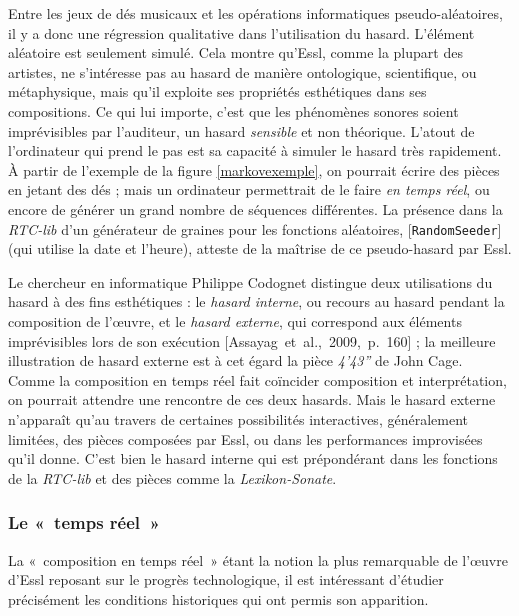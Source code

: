 \documentclass[a4paper,12pt]{article}
\newcommand{\guill}[1]{«~#1~»}
\newcommand{\patch}[1]{[\texttt{#1}]}
\newcommand{\cicite}[1]{{\footnotesize[#1]}}
\begin{document}
Entre les jeux de dés musicaux et les opérations informatiques pseudo-aléatoires, il y a donc une régression qualitative dans l'utilisation du hasard. L'élément aléatoire est seulement simulé. Cela montre qu'Essl, comme la plupart des artistes, ne s'intéresse pas au hasard de manière ontologique, scientifique, ou métaphysique, mais qu'il exploite ses propriétés esthétiques dans ses compositions. Ce qui lui importe, c'est que les phénomènes sonores soient imprévisibles par l'auditeur, un hasard \emph{sensible} et non théorique. L'atout de l'ordinateur qui prend le pas est sa capacité à simuler le hasard très rapidement. À partir de l'exemple de la figure \ref{markovexemple}, on pourrait écrire des pièces en jetant des dés ; mais un ordinateur permettrait de le faire \emph{en temps réel}, ou encore de générer un grand nombre de séquences différentes. La présence dans la \emph{RTC-lib} d'un générateur de graines pour les fonctions aléatoires, \patch{RandomSeeder} (qui utilise la date et l'heure), atteste de la maîtrise de ce pseudo-hasard par Essl.

Le chercheur en informatique Philippe Codognet distingue deux utilisations du hasard à des fins esthétiques : le \emph{hasard interne}, ou recours au hasard pendant la composition de l'œuvre, et le \emph{hasard externe}, qui correspond aux éléments imprévisibles lors de son exécution \cicite{Assayag~et~al.,~2009,~p.~160} ; la meilleure illustration de hasard externe est à cet égard la pièce \emph{4'43''} de John Cage. Comme la composition en temps réel fait coïncider composition et interprétation, on pourrait attendre une rencontre de ces deux hasards. Mais le hasard externe n'apparaît qu'au travers de certaines possibilités interactives, généralement limitées, des pièces composées par Essl, ou dans les performances improvisées qu'il donne. C'est bien le hasard interne qui est prépondérant dans les fonctions de la \emph{RTC-lib} et des pièces comme la \emph{Lexikon-Sonate}.

\subsubsection{Le \guill{temps réel}}
\label{tempsreel}

La \guill{composition en temps réel} étant la notion la plus remarquable de l'œuvre d'Essl reposant sur le progrès technologique, il est intéressant d'étudier précisément les conditions historiques qui ont permis son apparition.
\end{document}

